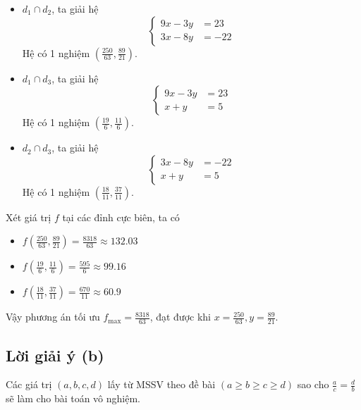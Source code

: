\documentclass[12pt]{article}
\begin{document}
\begin{itemize}
\item $d_1 \cap d_2$, ta giải hệ
\begin{equation}
\left\{ 
\begin{aligned}
9x - 3y &= 23 \\
3x - 8y &= -22
\end{aligned}
\right.
\end{equation}
Hệ có 1 nghiệm $\displaystyle \left(\frac{250}{63}, \frac{89}{21}\right)$.
\item $d_1 \cap d_3$, ta giải hệ
\begin{equation}
\left\{ 
\begin{aligned}
9x - 3y &= 23 \\
x + y &= 5
\end{aligned}
\right.
\end{equation}
Hệ có 1 nghiệm $\displaystyle \left(\frac{19}{6}, \frac{11}{6}\right)$.
\item $d_2 \cap d_3$, ta giải hệ
\begin{equation}
\left\{ 
\begin{aligned}
3x - 8y &= -22 \\
x + y &= 5
\end{aligned}
\right.
\end{equation}
Hệ có 1 nghiệm $\displaystyle \left(\frac{18}{11}, \frac{37}{11}\right)$.
\end{itemize}
Xét giá trị $f$ tại các đỉnh cực biên, ta có
\begin{itemize}
\item $\displaystyle f\left(\frac{250}{63}, \frac{89}{21}\right) = \frac{8318}{63} \approx 132.03$
\item $\displaystyle f\left(\frac{19}{6}, \frac{11}{6}\right) = \frac{595}{6} \approx 99.16$
\item $\displaystyle f\left(\frac{18}{11}, \frac{37}{11}\right) = \frac{670}{11} \approx 60.9$
\end{itemize}
Vậy phương án tối ưu $\displaystyle f_{\max} = \frac{8318}{63}$, đạt được khi $\displaystyle x = \frac{250}{63}, y = \frac{89}{21}$.
\subsection{Lời giải ý (b)}
Các giá trị $(a, b, c, d)$ lấy từ MSSV theo đề bài $(a \geq b \geq c \geq d)$ sao cho $\displaystyle \frac{a}{c} = \frac{d}{b}$ sẽ làm cho bài toán vô nghiệm.
\end{document}
